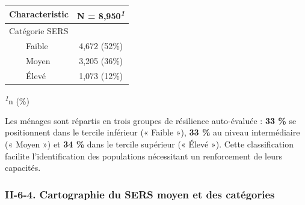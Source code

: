 \documentclass[
]{article}
\begin{document}
\begin{table}[!t]
\fontsize{9.8pt}{11.7pt}\selectfont
\begin{tabular*}{\linewidth}{@{\extracolsep{\fill}}lc}
\toprule
\textbf{Characteristic} & \textbf{N = 8,950}\textsuperscript{\textit{1}} \\ 
\midrule\addlinespace[2.5pt]
Catégorie SERS &  \\ 
    Faible & 4,672 (52\%) \\ 
    Moyen & 3,205 (36\%) \\ 
    Élevé & 1,073 (12\%) \\ 
\bottomrule
\end{tabular*}
\begin{minipage}{\linewidth}
\textsuperscript{\textit{1}}n (\%)\\
\end{minipage}
\end{table}

Les ménages sont répartis en trois groupes de résilience auto-évaluée :
\textbf{33 \%} se positionnent dans le tercile inférieur (« Faible »),
\textbf{33 \%} au niveau intermédiaire (« Moyen ») et \textbf{34 \%}
dans le tercile supérieur (« Élevé »). Cette classification facilite
l'identification des populations nécessitant un renforcement de leurs
capacités.

\hypertarget{ii-6-4.-cartographie-du-sers-moyen-et-des-catuxe9gories}{%
\subsubsection{II-6-4. Cartographie du SERS moyen et des
catégories}\label{ii-6-4.-cartographie-du-sers-moyen-et-des-catuxe9gories}}
\end{document}
